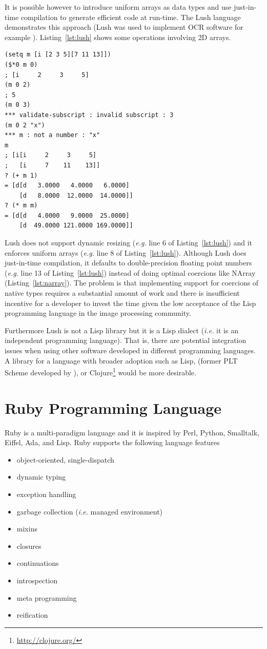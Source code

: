 \documentclass[12pt,a4paper,oneside,openright]{book}
\newcommand{\eg}{\emph{e.g.} }
\newcommand{\ie}{\emph{i.e.} }
\newcommand{\Ie}{That is, }
\newcommand{\lst}[1]{Listing~\ref{lst:#1}}
\newcommand{\removed}[1]{\cbstart\removedfragile{#1}\cbend{}}
\newcommand{\removedfragile}[1]{{\color{red}{\sout{#1}}}{}}
\newcommand{\added}[1]{\cbstart\addedfragile{#1}\cbend{}}
\newcommand{\addedfragile}[1]{{\color{green!50!black}{\uline{#1}}}{}}
\newcommand{\removed}[1]{}
\newcommand{\removedfragile}[1]{}
\newcommand{\added}[1]{#1}
\newcommand{\addedfragile}[1]{#1}
\newcommand{\changed}[2]{\removed{#1}\added{#2}}
\newcommand{\lispout}{Comment lines (preceded with ``;'') show the output of the program}
\begin{document}
\begin{CJK}{UTF8}{}
It is possible however to introduce uniform arrays as data types and use just-in-time compilation to generate efficient code at run-time. The Lush language demonstrates this approach (Lush was used to implement \ac{OCR} software for example \citep{726791}). \lst{lush} shows some operations involving \ac{2D} arrays.
\lstset{language=Lisp,frame=single,numbers=left}
\begin{lstlisting}[float=htbp,caption={Lush programming language. \lispout},label=lst:lush]
(setq m [i [2 3 5][7 11 13]])
($*0 m 0)
; [i     2     3     5]
(m 0 2)
; 5
(m 0 3)
*** validate-subscript : invalid subscript : 3
(m 0 2 "x")
*** m : not a number : "x"
m
; [i[i     2     3     5]
;   [i     7    11    13]]
? (+ m 1)
= [d[d   3.0000   4.0000   6.0000]
    [d   8.0000  12.0000  14.0000]]
? (* m m)
= [d[d   4.0000   9.0000  25.0000]
    [d  49.0000 121.0000 169.0000]]
\end{lstlisting}
Lush does not support dynamic resizing (\eg line 6 of \lst{lush}) and it enforces uniform arrays (\eg line 8 of \lst{lush}). Although Lush does just-in-time compilation, it defaults to double-precision floating point numbers (\eg line 13 of \lst{lush}) instead of doing optimal coercions like NArray (\lst{narray}). The problem is that implementing support for coercions of native types requires a substantial amount of work and there is insufficient incentive for a developer to invest the time given the low acceptance of the Lisp programming language in the image processing community.

Furthermore Lush is not a Lisp library but it is a Lisp dialect (\ie it is an independent programming language). \Ie there are potential integration issues when using other software developed in different programming languages. A library for a language with broader adoption such as Lisp, \changed{Scheme}{Racket} (former PLT Scheme developed by \citet{Steele1979}), or Clojure\footnote{\url{http://clojure.org/}} would be more desirable.

\section{Ruby Programming Language}\label{cha:ruby}
Ruby is a multi-paradigm language and it is inspired by Perl, Python, Smalltalk, Eiffel, Ada, and Lisp. Ruby supports the following language features
\begin{itemize}
\item object-oriented, single-dispatch
\item dynamic typing
\item exception handling
\item garbage collection (\ie managed environment)
\item mixins
\item closures
\item continuations
\item introspection
\item meta programming
\item reification
\end{itemize}


\end{CJK}
\end{document}
